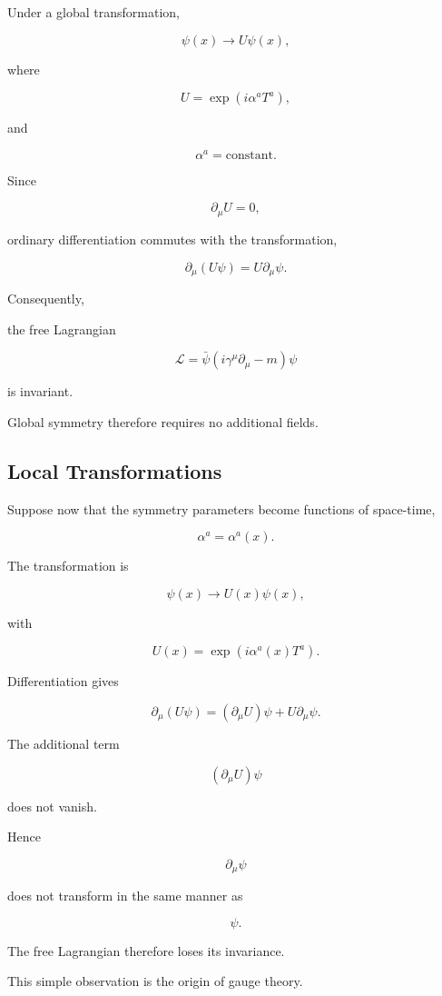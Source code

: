 Under a global transformation,

\[
\boxed{
\psi(x)
\rightarrow
U\psi(x),
}
\]

where

\[
U
=
\exp
(i\alpha^aT^a),
\]

and

\[
\alpha^a
=
\text{constant}.
\]

Since

\[
\partial_\mu U=0,
\]

ordinary differentiation commutes with the transformation,

\[
\partial_\mu(U\psi)
=
U\partial_\mu\psi.
\]

Consequently,

the free Lagrangian

\[
\mathcal L
=
\bar\psi
(i\gamma^\mu\partial_\mu-m)
\psi
\]

is invariant.

Global symmetry therefore requires no additional fields.


\subsection{Local Transformations}

Suppose now that the symmetry parameters become functions of space-time,

\[
\alpha^a
=
\alpha^a(x).
\]

The transformation is

\[
\boxed{
\psi(x)
\rightarrow
U(x)\psi(x),
}
\]

with

\[
U(x)
=
\exp
(i\alpha^a(x)T^a).
\]

Differentiation gives

\[
\partial_\mu
(U\psi)
=
(\partial_\mu U)\psi
+
U\partial_\mu\psi.
\]

The additional term

\[
(\partial_\mu U)\psi
\]

does not vanish.

Hence

\[
\partial_\mu\psi
\]

does not transform in the same manner as

\[
\psi.
\]

The free Lagrangian therefore loses its invariance.

This simple observation is the origin of gauge theory.

